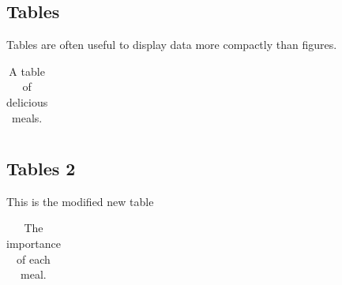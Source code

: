 \documentclass[12pt]{article}
\begin{document}
\subsection{Tables}
Tables are often useful to display data more compactly than figures.

\begin{table}[h]
\begin{centering}
  \begin{tabular}{| l | c |}
   \hline 
     
   \hline
  \end{tabular}
  \caption{A table of delicious meals. \label{tab:1}}
  \end{centering}
\end{table}

\subsection{Tables 2}
This is the modified new table 

\begin{table}[h]
\begin{centering}
  \begin{tabular}{| l | c |}
   \hline 
     
   \hline
  \end{tabular}
  \caption{The importance of each meal. \label{tab:2}}
  \end{centering}
\end{table}
%
%
\end{document}
